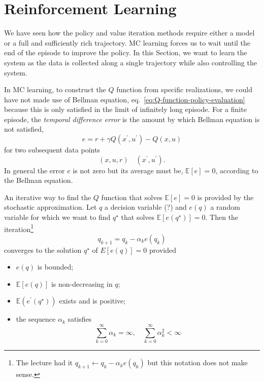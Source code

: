 \chapter{Reinforcement Learning}
\label{chap:r-learning}

We have seen how the policy and value iteration methods require either a model or a full and sufficiently rich trajectory. MC learning forces us to wait until the end of the episode to improve the policy. In this Section, we want to learn the system as the data is collected along a single trajectory while also controlling the system.

In MC learning, to construct the $Q$ function from specific realizations, we could have not made use of Bellman equation, eq.~\eqref{eq:Q-function-policy-evaluation} because this is only satisfied in the limit of infinitely long episode. For a finite episode, the \emph{temporal difference error} is the amount by which Bellman equation is not satisfied,
\begin{equation}
  \label{eq:TD-error}
  e = r + \gamma Q(x^\prime,u^\prime) - Q(x,u)
\end{equation}
for two subsequent data points
\begin{equation*}
  (x,u,r)\quad (x^\prime,u^\prime).
\end{equation*}
In general the error $e$ is not zero but its average must be, $\mathbb{E}[e] = 0$, according to the Bellman equation.

An iterative way to find the $Q$ function that solves $\mathbb{E}[e] = 0$ is provided by the stochastic approximation. Let $q$ a decision variable (?) and $e(q)$ a random variable for which we want to find $q^\star$ that solves $\mathbb{E}[e(q^\star)]=0$. Then the iteration\footnote{The lecture had it $q_{k+1} \leftarrow q_k -\alpha_k e(q_k)$ but this notation does not make sense.}
\begin{equation}
  \label{eq:TD-error-iterative-solution}
  q_{k+1} = q_k -\alpha_k e(q_k)
\end{equation}
converges to the solution $q^\star$ of $E[e(q)]=0$ provided
\begin{itemize}
\item $e(q)$ is bounded;
\item $\mathbb{E}[e(q)]$ is non-decreasing in $q$;
\item $\mathbb{E}(e^\prime(q^\star))$ exists and is positive;
\item the sequence $\alpha_k$ satisfies
  \begin{equation*}
    \sum_{k=0}^\infty \alpha_k = \infty, \quad \sum_{k=0}^\infty \alpha_k^2 < \infty
  \end{equation*}
\end{itemize}

